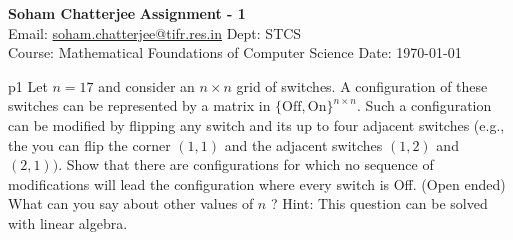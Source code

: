 \documentclass[a4paper, 11pt]{article}
\begin{document}
	
	
	\textsf{\noindent \large\textbf{Soham Chatterjee} \hfill \textbf{Assignment - 1}\\
		Email: \href{soham.chatterjee@tifr.res.in}{soham.chatterjee@tifr.res.in} \hfill Dept: STCS\\
		\normalsize Course: Mathematical Foundations of Computer Science \hfill Date: \today}
	
	
\begin{problem}{%
	}{p1%
}
Let $n=17$ and consider an $n \times n$ grid of switches. A configuration of these switches can be represented by a matrix in $\{\mathrm{Off}, \mathrm{On}\}^{n \times n}$. Such a configuration can be modified by flipping any switch and its up to four adjacent switches (e.g., the you can flip the corner $(1,1)$ and the adjacent switches $(1,2)$ and $(2,1))$. Show that there are configurations for which no sequence of modifications will lead the configuration where every switch is Off. (Open ended) What can you say about other values of $n$ ?
Hint: This question can be solved with linear algebra.

\end{problem}
\solve{	

}
\end{document}
